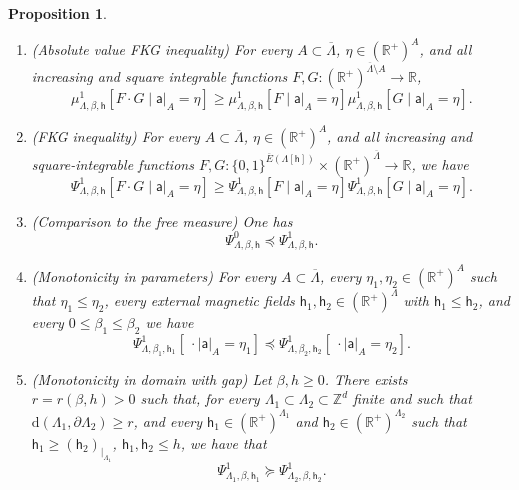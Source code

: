 \documentclass[11pt,a4paper]{article}
\numberwithin{equation}{section}
\theoremstyle{plain}
\newtheorem{Prop}[Thm]{Proposition}
\theoremstyle{definition}
\begin{document}
\begin{Prop}
\begin{enumerate}
\item[$\bullet$] \textup{(Absolute value FKG inequality)} For every  $A \subset \overline \Lambda$, $\eta \in (\mathbb R^+)^A$, and all increasing and square integrable functions $F,G: (\mathbb{R}^+)^{\overline{\Lambda} \setminus A}\to\mathbb{R}$, 
\begin{equation} \label{eq: conditional abs fkg plus}
\mu_{\Lambda,\beta,\mathsf{h}}^{1}[F\cdot G \mid \mathsf a|_A=\eta]\geq \mu_{\Lambda,\beta,\mathsf{h}}^{1}[F \mid \mathsf a|_A=\eta]\mu_{\Lambda,\beta,\mathsf{h}}^{1}[G \mid \mathsf a|_A=\eta].
\end{equation}
    \item[$\bullet$] \textup{(FKG inequality)} For every $A \subset \overline\Lambda$, $\eta \in (\mathbb R^+)^A$, and all increasing and square-integrable functions $F,G: \{0,1\}^{\overline E(\Lambda[\mathsf h])}\times (\mathbb R^+)^{\overline{\Lambda}}\to\mathbb{R}$,
we have
\begin{equation} \label{eq: fkg plus}
\Psi_{\Lambda,\beta,\mathsf{h}}^{1}[F\cdot G \mid \mathsf a|_A=\eta]
\geq
\Psi_{\Lambda,\beta,\mathsf{h}}^{1}[F \mid \mathsf a|_A=\eta] \Psi_{\Lambda,\beta,\mathsf{h}}^{1}[G \mid \mathsf a|_A=\eta].
\end{equation}
\item[$\bullet$] \textup{(Comparison to the free measure)} One has
    \begin{equation}\label{eq:phi1 dominates psi0 finite volume}
    \Psi^0_{\Lambda,\beta,\mathsf{h}}\preccurlyeq \Psi^{1}_{\Lambda,\beta,\mathsf{h}}.
\end{equation}
\item[$\bullet$]\textup{(Monotonicity in parameters)} For every $A\subset \overline\Lambda$, every $\eta_1,\eta_2\in (\mathbb{R}^+)^{A}$ such that $\eta_1\leq \eta_2$, every external magnetic fields $\mathsf{h}_1,\mathsf{h}_2\in (\mathbb R^+)^\Lambda$ with $\mathsf h_1\leq \mathsf h_2$, and every $0\leq\beta_1\leq \beta_2$ we have
\begin{equation} \label{eq: conditional stochastic domiation wired}
\Psi_{\Lambda,\beta_1,\mathsf h_1}^1[\:\cdot \mid \mathsf{a}|_A=\eta_1] \preccurlyeq \Psi_{\Lambda,\beta_2,\mathsf h_2}^1[\:\cdot \mid \mathsf{a}|_A=\eta_2].
\end{equation}
    \item[$\bullet$] \textup{(Monotonicity in domain with gap)} Let $\beta,h \geq 0$. There exists $r=r(\beta,h)>0$ such that, for every $\Lambda_1 \subset \Lambda_2 \subset \mathbb Z^d$ finite and such that $\mathrm{d}(\Lambda_1, \partial \Lambda_2) \geq r$, and every $\mathsf h_1 \in (\mathbb R^+)^{\Lambda_1}$ and $\mathsf h_2 \in (\mathbb R^+)^{\Lambda_2}$ such that $\mathsf h_1 \geq (\mathsf h_2)_{|_{\Lambda_1}}$, $\mathsf h_1,\mathsf{h}_2\leq h$, we have that
    \begin{equation}\label{eq: monot in domain wired FK}
        \Psi^1_{\Lambda_1, \beta, \mathsf h_1} \succcurlyeq \Psi^1_{\Lambda_2, \beta, \mathsf h_2}. 
    \end{equation}
\end{enumerate}
\end{Prop}
\end{document}
